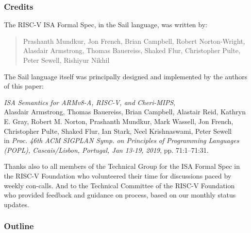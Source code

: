 \documentclass[aspectratio=169]{beamer}
\newcommand{\slidefont}{\scriptsize}
\begin{document}

\begin{frame}[fragile]
  \frametitle{Credits}

  \slidefont

  The RISC-V ISA Formal Spec, in the Sail language, was written by:

  \begin{quote}
    Prashanth Mundkur,
    Jon French,
    Brian Campbell,
    Robert Norton-Wright,
    Alasdair Armstrong,
    Thomas Bauereiss,
    Shaked Flur,
    Christopher Pulte,
    Peter Sewell,
    Rishiyur Nikhil
  \end{quote}

  \vspace{4ex}

  The Sail language itself was principally designed and implemented by
  the authors of this paper:

  \vspace{1ex}

  \hfill \begin{minipage}{0.95\textwidth}
    \emph{ISA Semantics for ARMv8-A, RISC-V, and Cheri-MIPS}, \\
    Alasdair Armstrong,
    Thomas Bauereiss,
    Brian Campbell,
    Alastair Reid,
    Kathryn E. Gray,
    Robert M. Norton,
    Prashanth Mundkur,
    Mark Wassell,
    Jon French,
    Christopher Pulte,
    Shaked Flur,
    Ian Stark,
    Neel Krishnaswami,
    Peter Sewell \\
    in \emph{Proc. 46th ACM SIGPLAN Symp. on Principles of Programming
    Languages (POPL), Cascais/Lisbon, Portugal, Jan 13-19, 2019},
    pp. 71:1--71:31.
  \end{minipage}

  \vspace{4ex}

  Thanks also to all members of the Technical Group for the ISA Formal
  Spec in the RISC-V Foundation who volunteered their time for
  discussions paced by weekly con-calls.  And to the Technical
  Committee of the RISC-V Foundation who provided feedback and
  guidance on process, based on our monthly status updates.

\end{frame}


\begin{frame}[fragile]
  \frametitle{Outline}
  \tableofcontents
\end{frame}
\end{document}
